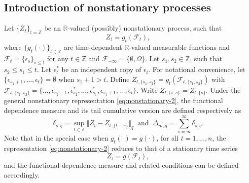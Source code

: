\documentclass[11pt]{article}
\theoremstyle{plain}
\theoremstyle{definition}
\begin{document}
\subsection{Introduction of nonstationary processes}
Let $\{Z_t\}_{t = \mathbb{Z}}$ be an $\mathbb{R}$-valued (possibly) nonstationary process, such that
    \begin{equation}\label{eq:nonstationary-2}
        Z_t = g_t(\mathcal{F}_t),
    \end{equation}
where $\{g_t(\cdot)\}_{t \in \mathbb{Z}}$ are time-dependent $\mathbb{R}$-valued measurable functions and $\mathcal{F}_{t} = \{\epsilon_s\}_{s \leq t}$ for any $t \in \mathbb{Z}$ and $\mathcal{F}_{-\infty} = \{\emptyset, \Omega\}$. Let $s_1, s_2 \in \mathbb{Z}$, such that $s_2 \leq s_1 \leq t$. Let $\epsilon_t^*$ be an independent copy of $\epsilon_t$. For notational convenience, let $\{\epsilon_{s_1+1}, \dots, \epsilon_t\} = \emptyset$ when $s_1+1 > t$. Define $Z_{t, \{s_1, s_2\}} = g_t(\mathcal{F}_{t,\{s_1, s_2\}})$ with $\mathcal{F}_{t,\{s_1, s_2\}} = \{\dots, \epsilon_{s_2-1}, \epsilon_{s_2}^*, \dots, \epsilon_{s_1}^*, \epsilon_{s_1+1}, \dots, \epsilon_t\}$. Write $Z_{t, \{s,s\}} = Z_{t,\{s\}}$. Under the general nonstationary representation \eqref{eq:nonstationary-2}, the functional dependence measure and its tail cumulative version are defined respectively as
\begin{equation*}
  \delta_{s, q} = \sup_{t \in \mathbb{Z}}\Vert Z_{t} - Z_{t,\{t-s\}} \Vert_{q} \;\;\text{and}\;\; \Delta_{m, q} = \sum_{s = m}^{\infty}\delta_{s, q}.
\end{equation*}
Note that in the special case when $g_t(\cdot) = g(\cdot)$, for all $t = 1, \dots, n$, the representation \eqref{eq:nonstationary-2} reduces to that of a stationary time series
\begin{equation*}
    Z_t = g(\mathcal{F}_t),
\end{equation*}
and the functional dependence measure and related conditions can be defined accordingly.
\end{document}
